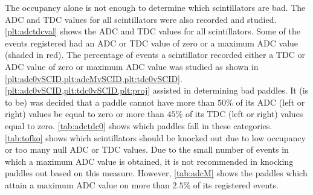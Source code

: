 The occupancy alone is not enough to determine which scintillators are bad. The ADC and TDC values for all scintillators were also recorded and studied. \ref{plt:adctdcval} shows the ADC and TDC values for all scintillators. Some of the events registered had an ADC or TDC value of zero or a maximum ADC value (shaded in red). The percentage of events a scintillator recorded either a TDC or ADC value of zero or maximum ADC value was studied as shown in \ref{plt:adc0vSCID,plt:adcMvSCID,plt:tdc0vSCID}. \ref{plt:adc0vSCID,plt:tdc0vSCID,plt:proj} assisted in determining bad paddles. It (is to be) was decided that a paddle cannot have more than $50\%$ of its ADC (left or right) values be equal to zero or more than $45\%$ of its TDC (left or right) values equal to zero. \ref{tab:adctdc0} shows which paddles fall in these categories. \ref{tab:tofko} shows which scintillators should be knocked out due to low occupancy or too many null ADC or TDC values. Due to the small number of events in which a maximum ADC value is obtained, it is not recommended in knocking paddles out based on this measure. However, \ref{tab:adcM} shows the paddles which attain a maximum ADC value on more than $2.5\%$ of its registered events.









